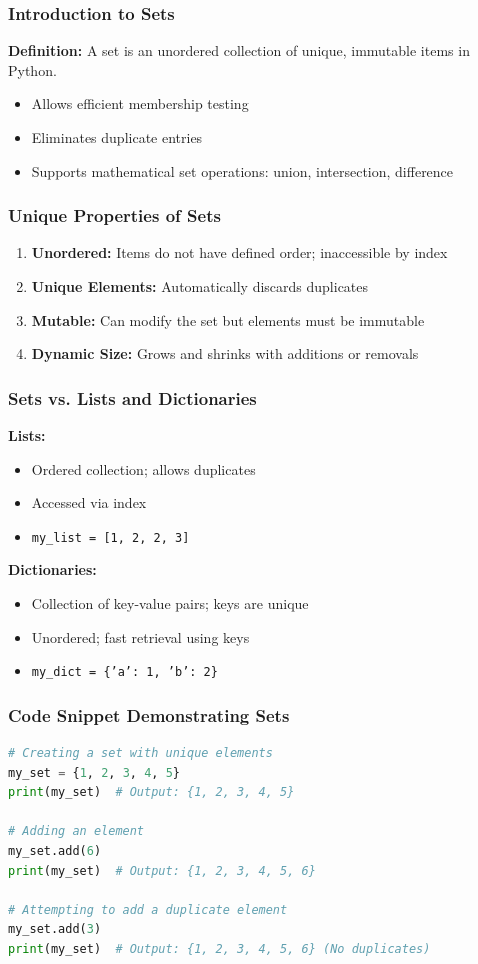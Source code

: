 \documentclass{beamer}
\begin{document}
\begin{frame}
    \frametitle{Introduction to Sets}
    \textbf{Definition:} A set is an unordered collection of unique, immutable items in Python. 
    \begin{itemize}
        \item Allows efficient membership testing
        \item Eliminates duplicate entries
        \item Supports mathematical set operations: union, intersection, difference
    \end{itemize}
\end{frame}

\begin{frame}
    \frametitle{Unique Properties of Sets}
    \begin{enumerate}
        \item \textbf{Unordered:} Items do not have defined order; inaccessible by index
        \item \textbf{Unique Elements:} Automatically discards duplicates
        \item \textbf{Mutable:} Can modify the set but elements must be immutable
        \item \textbf{Dynamic Size:} Grows and shrinks with additions or removals
    \end{enumerate}
\end{frame}

\begin{frame}
    \frametitle{Sets vs. Lists and Dictionaries}
    \textbf{Lists:}
    \begin{itemize}
        \item Ordered collection; allows duplicates
        \item Accessed via index
        \item \texttt{my\_list = [1, 2, 2, 3]}
    \end{itemize}

    \textbf{Dictionaries:}
    \begin{itemize}
        \item Collection of key-value pairs; keys are unique
        \item Unordered; fast retrieval using keys
        \item \texttt{my\_dict = \{'a': 1, 'b': 2\}}
    \end{itemize}
\end{frame}

\begin{frame}[fragile]
    \frametitle{Code Snippet Demonstrating Sets}
    \begin{lstlisting}[language=Python]
# Creating a set with unique elements
my_set = {1, 2, 3, 4, 5}
print(my_set)  # Output: {1, 2, 3, 4, 5}

# Adding an element
my_set.add(6)
print(my_set)  # Output: {1, 2, 3, 4, 5, 6}

# Attempting to add a duplicate element
my_set.add(3)
print(my_set)  # Output: {1, 2, 3, 4, 5, 6} (No duplicates)
    \end{lstlisting}
\end{frame}
\end{document}

